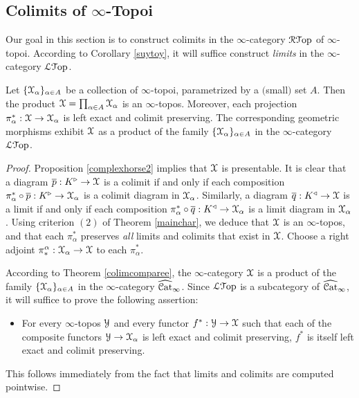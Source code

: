 \subsection{Colimits of $\infty$-Topoi}\label{colimtop}

Our goal in this section is to construct colimits in the $\infty$-category $\operatorname{\mathcal{R}{\mathcal T}op}$ of $\infty$-topoi. 
According to Corollary \ref{suytoy}, it will suffice construct {\em limits} in the $\infty$-category $\operatorname{\mathcal{L}{\mathcal T}op}$. 

\begin{proposition}\label{quathorse}
Let $\{ \operatorname{\mathcal{X}}_{\alpha} \}_{\alpha \in A}$ be a collection of $\infty$-topoi, parametrized by a $($small$)$
set $A$. Then the product $\operatorname{\mathcal{X}} = \prod_{\alpha \in A} \operatorname{\mathcal{X}}_{\alpha}$ is an $\infty$-topos.
Moreover, each projection $\pi^{\ast}_{\alpha}: \operatorname{\mathcal{X}} \rightarrow \operatorname{\mathcal{X}}_{\alpha}$ is left exact and colimit preserving. The corresponding geometric morphisms exhibit $\operatorname{\mathcal{X}}$ as a product of the family $\{ \operatorname{\mathcal{X}}_{\alpha} \}_{\alpha \in A}$ in the $\infty$-category $\operatorname{\mathcal{L}{\mathcal T}op}$.
\end{proposition}

\begin{proof}
Proposition \ref{complexhorse2} implies that $\operatorname{\mathcal{X}}$ is presentable.
It is clear that a diagram $\overline{p}: K^{\triangleright} \rightarrow \operatorname{\mathcal{X}}$ is a colimit if and only if each composition
$\pi^{\ast}_{\alpha} \circ \overline{p}: K^{\triangleright} \rightarrow \operatorname{\mathcal{X}}_{\alpha}$
is a colimit diagram in $\operatorname{\mathcal{X}}_{\alpha}$. 
Similarly, a diagram $\overline{q}: K^{\triangleleft} \rightarrow \operatorname{\mathcal{X}}$ is a limit if and only if each composition
$\pi^{\ast}_{\alpha} \circ \overline{q}: K^{\triangleleft} \rightarrow \operatorname{\mathcal{X}}_{\alpha}$
is a limit diagram in $\operatorname{\mathcal{X}}_{\alpha}$. Using criterion $(2)$ of Theorem \ref{mainchar}, we deduce that $\operatorname{\mathcal{X}}$ is an $\infty$-topos, and that each $\pi^{\ast}_{\alpha}$ preserves {\em all} limits and colimits that exist in $\operatorname{\mathcal{X}}$. Choose a right adjoint
$\pi_{\ast}^{\alpha}: \operatorname{\mathcal{X}}_{\alpha} \rightarrow \operatorname{\mathcal{X}}$ to each $\pi^{\ast}_{\alpha}$. 

According to Theorem \ref{colimcomparee}, the $\infty$-category $\operatorname{\mathcal{X}}$ is a product
of the family $\{ \operatorname{\mathcal{X}}_{\alpha} \}_{\alpha \in A}$ in the $\infty$-category $\widehat{\operatorname{\mathcal{C}at}}_{\infty}$. Since $\operatorname{\mathcal{L}{\mathcal T}op}$ is a subcategory of $\widehat{\operatorname{\mathcal{C}at}}_{\infty}$, it will suffice to prove the following assertion:

\begin{itemize}
\item For every $\infty$-topos $\operatorname{\mathcal{Y}}$ and every functor $f^{\ast}: \operatorname{\mathcal{Y}} \rightarrow \operatorname{\mathcal{X}}$
such that each of the composite functors $\operatorname{\mathcal{Y}} \rightarrow \operatorname{\mathcal{X}}_{\alpha}$ is left exact and colimit preserving, $f^{\ast}$ is itself left exact and colimit preserving.
\end{itemize}

This follows immediately from the fact that limits and colimits are computed pointwise.
\end{proof}

